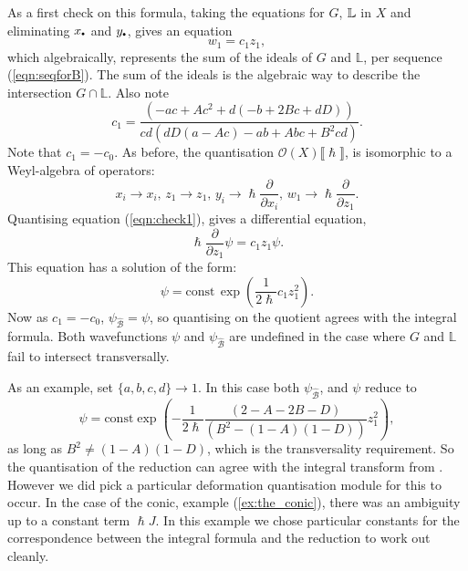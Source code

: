    
    As a first check on this formula, taking the equations for \(G\), \(\mathbb{L}\) in \(X\) and eliminating \(x_{\sbt}\) and \( y_{\sbt}\), gives an equation
    \begin{equation}
        \label{eqn:check1}
        w_1 = c_1 z_1,
    \end{equation}
    which algebraically, represents the sum of the ideals of \(G\) and \( \mathbb{L}\), per sequence (\ref{eqn:seqforB}). The sum of the ideals is the algebraic way to describe the intersection \( G \cap \mathbb{L}\). Also note
    \[ c_1 = \frac{   \left(-a c+A c^2+d (-b+2 B c+d D)\right)}{c d \left(d D (a-A c)-a b+A b c+B^2 c d\right)}. \]
    Note that \(c_1 = -c_0\).  As before, the quantisation \(\mathcal{O}(X)\lBrack \hslash \rBrack\), is isomorphic to a Weyl-algebra of operators:
    \[ x_i \rightarrow x_i, \, z_1 \rightarrow z_1, \, y_i \rightarrow \hslash \frac{\partial}{\partial x_i}, \, w_1 \rightarrow \hslash \frac{\partial}{\partial z_1}. \] 
    Quantising equation (\ref{eqn:check1}), gives a differential equation, 
    \[ \hslash \frac{\partial}{\partial z_1} \psi = c_1 z_1 \psi. \]
    This equation has a solution of the form:
    \[ \psi =  \mathrm{const} \, \exp\left( \frac{1}{2 \hslash} c_1 z_1^2 \right).\]
    Now as \(c_1 = -c_0\), \( \psi_{\widehat{\mathcal{B}}} = \psi\), so quantising on the quotient agrees with the integral formula.
    Both wavefunctions \( \psi\) and \(\psi_{\widehat{\mathcal{B}}}\) are undefined in the case where \(G\) and \( \mathbb{L}\) fail to intersect transversally.
    
    As an example, set \( \{ a,b,c,d\} \rightarrow 1\). In this case both \(\psi_{\widehat{\mathcal{B}}}\), and \( \psi\) reduce to
    \[ \psi = \mathrm{const} \exp \left( -\frac{1}{2 \hslash } \frac{ (2-A-2 B-D)}{ \left(B^2-(1-A)(1-D)\right)} z_1^2 \right),\]
    as long as \( B^2 \neq (1-A)(1-D)\), which is the transversality requirement.  So the quantisation of the reduction can agree with the integral transform from \cite{ks_airy}. However we did pick a particular deformation quantisation module for this to occur. In the case of the conic, example (\ref{ex:the_conic}), there was an ambiguity up to a constant term \( \hslash J\). In this example we chose particular constants for the correspondence between the integral formula and the reduction to work out cleanly.
    
